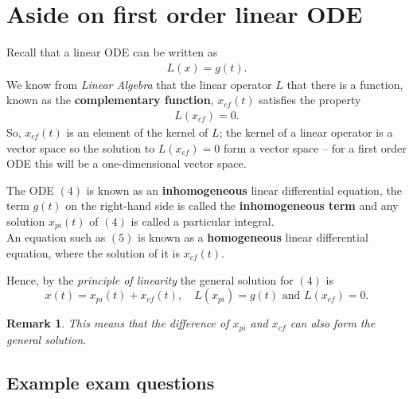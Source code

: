 \documentclass[12pt, a4paper]{article}
\newtheorem*{remark}{Remark}
\theoremstyle{definition}
\theoremstyle{plain}
\begin{document}
\section*{Aside on first order linear ODE}

Recall that a linear ODE can be written as \begin{align} L(x)=g(t). \end{align} We know from \textit{Linear Algebra} that the linear operator $L$ that there is a function, known as the \textbf{complementary function}, $x_{cf}(t)$ satisfies the property \begin{align} L(x_{cf})=0. \end{align} So, $x_{cf}(t)$ is an element of the kernel of $L$; the kernel of a linear operator is a vector space so the solution to $L(x_{cf})=0$ form a vector space -- for a first order ODE this will be a one-dimensional vector space. 

The ODE $(4)$ is known as an \textbf{inhomogeneous} linear differential equation, the term $g(t)$ on the right-hand side is called the \textbf{inhomogeneous term} and any solution $x_{pi}(t)$ of $(4)$ is called a particular integral. \\
An equation such as $(5)$ is known as a \textbf{homogeneous} linear differential equation, where the solution of it is $x_{cf}(t).$ 

Hence, by the \textit{principle of linearity} the general solution for $(4)$ is $$x(t)=x_{pi}(t)+x_{cf}(t), \quad L(x_{pi})=g(t) \text{ and } L(x_{cf})=0.$$

\begin{remark}
This means that the difference of $x_{pi}$ and $x_{cf}$ can also form the general solution.
\end{remark}

\subsection*{Example exam questions}
\end{document}
